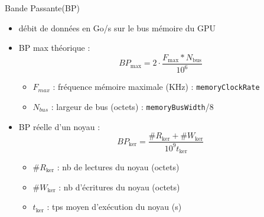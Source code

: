 \documentclass[11pt,mathserif]{beamer}
\begin{document}
\begin{frame}{Bande Passante(BP)}
  \begin{itemize}[<+->]
    \item débit de données en Go/s sur le bus mémoire du GPU 
    \item BP max théorique : $$BP_{\mbox{max}} = 2 \cdot \frac{F_{\mbox{max}} * N_{\mbox{bus}}}{10^6} $$
      \begin{itemize}
        \item $F_{max}$ : fréquence mémoire maximale (KHz) : \texttt{memoryClockRate}
        \item $N_{bus}$ : largeur de bus (octets) : \texttt{memoryBusWidth}/8
      \end{itemize}
    \item BP réelle d'un noyau : $$ BP_{\mbox{ker}} = \frac{\# R_{\ker} + \# W_{\ker}}{10^9 t_{\ker}} $$
      \begin{itemize}
        \item $\# R_{\ker}$ : nb de lectures du noyau (octets)
        \item $\# W_{\ker}$ : nb d'écritures du noyau (octets)
        \item $t_{\ker}$ : tps moyen d'exécution du noyau (s)
      \end{itemize}
  \end{itemize}
\end{frame}
\end{document}
